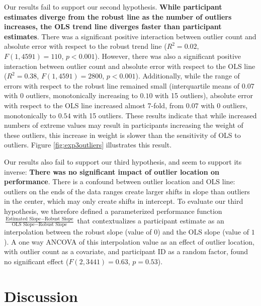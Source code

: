 \documentclass{sigchi}
\begin{document}
Our results fail to support our second hypothesis. \textbf{While participant estimates diverge from the robust line as the number of outliers increases, the OLS trend line diverges faster than participant estimates}. There was a significant positive interaction between outlier count and absolute error with respect to the robust trend line ($R^2 = 0.02$, $F(1,4591)=110$, $p<0.001$). However, there was also a significant positive interaction between outlier count and absolute error with respect to the OLS line  ($R^2 = 0.38$, $F(1,4591)=2800$, $p<0.001$). Additionally, while the range of errors with respect to the robust line remained small (interquartile means of $0.07$ with 0 outliers, monotonically increasing to $0.10$ with 15 outliers), absolute error with respect to the OLS line increased almost 7-fold, from $0.07$ with 0 outliers, monotonically to $0.54$ with 15 outliers. These results indicate that while increased numbers of extreme values may result in participants increasing the weight of these outliers, this increase in weight is slower than the sensitivity of OLS to outliers.  Figure \ref{fig:exp3outliers} illustrates this result.

Our results also fail to support our third hypothesis, and seem to support its inverse: \textbf{There was no significant impact of outlier location on performance}. There is a confound between outlier location and OLS line: outliers on the ends of the data ranges create larger shifts in slope than outliers in the center, which may only create shifts in intercept. To evaluate our third hypothesis, we therefore defined a parameterized performance function $\frac{\text{Estimated Slope}-\text{Robust Slope}}{\text{OLS Slope} - \text{Robust Slope}}$ that contextualizes a participant estimate as an interpolation between the robust slope (value of $0$) and the OLS slope (value of $1$). A one way ANCOVA of this interpolation value as an effect of outlier location, with outlier count as a covariate, and participant ID as a random factor, found no significant effect ($F(2,3441)=0.63$, $p=0.53$).


\section{Discussion}
\end{document}
